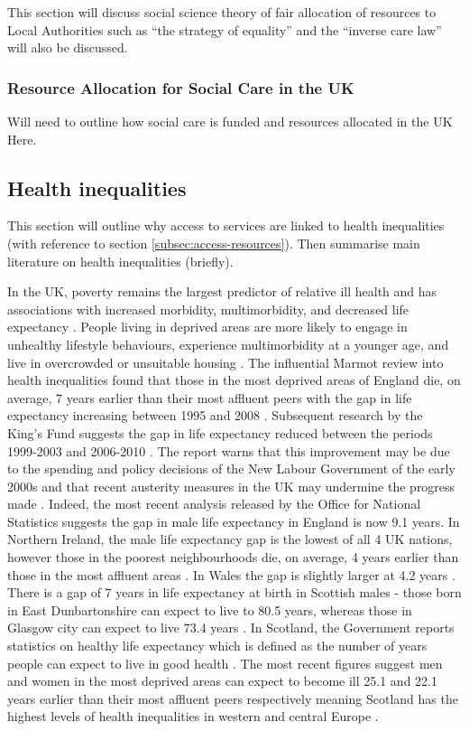 \documentclass[12pt,]{report}
\begin{document}
This section will discuss social science theory of fair allocation of
resources to Local Authorities such as ``the strategy of equality'' and
the ``inverse care law'' will also be discussed.

\subsubsection{Resource Allocation for Social Care in the UK}\label{subsubsec:resources-uk}

Will need to outline how social care is funded and resources allocated
in the UK Here.

\subsection{Health inequalities}\label{subsec:health-inequals}

This section will outline why access to services are linked to health
inequalities (with reference to section \ref{subsec:access-resources}).
Then summarise main literature on health inequalities (briefly).

In the UK, poverty remains the largest predictor of relative ill health
and has associations with increased morbidity, multimorbidity, and
decreased life expectancy \citep{RN37}. People living in deprived areas
are more likely to engage in unhealthy lifestyle behaviours, experience
multimorbidity at a younger age, and live in overcrowded or unsuitable
housing \citep{RN37, RN311}. The influential Marmot review into health
inequalities found that those in the most deprived areas of England die,
on average, 7 years earlier than their most affluent peers \citep{RN312}
with the gap in life expectancy increasing between 1995 and 2008
\citep{RN313}. Subsequent research by the King's Fund suggests the gap
in life expectancy reduced between the periods 1999-2003 and 2006-2010
\citep{RN314}. The report warns that this improvement may be due to the
spending and policy decisions of the New Labour Government of the early
2000s and that recent austerity measures in the UK may undermine the
progress made \citep{RN314}. Indeed, the most recent analysis released
by the Office for National Statistics \citeyearpar{RN375} suggests the
gap in male life expectancy in England is now 9.1 years. In Northern
Ireland, the male life expectancy gap is the lowest of all 4 UK nations,
however those in the poorest neighbourhoods die, on average, 4 years
earlier than those in the most affluent areas \citep{RN375}. In Wales
the gap is slightly larger at 4.2 years \citep{RN375}. There is a gap of
7 years in life expectancy at birth in Scottish males - those born in
East Dunbartonshire can expect to live to 80.5 years, whereas those in
Glasgow city can expect to live 73.4 years \citep{RN375}. In Scotland,
the Government reports statistics on healthy life expectancy which is
defined as the number of years people can expect to live in good health
\citep{RN315}. The most recent figures suggest men and women in the most
deprived areas can expect to become ill 25.1 and 22.1 years earlier than
their most affluent peers respectively \citep{RN315} meaning Scotland
has the highest levels of health inequalities in western and central
Europe \citep{RN385, RN386}.
\end{document}
